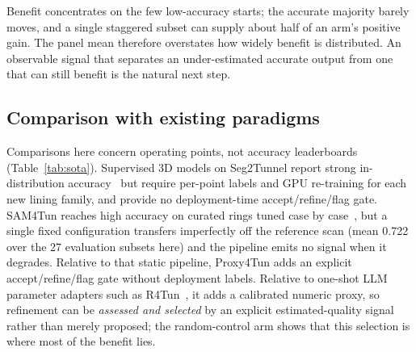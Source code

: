 \documentclass[a4paper,fleqn]{cas-dc}
\begin{document}
Benefit concentrates on the few low-accuracy starts; the accurate majority barely moves, and a single staggered subset can supply about half of an arm's positive gain. The panel mean therefore overstates how widely benefit is distributed. An observable signal that separates an under-estimated accurate output from one that can still benefit is the natural next step.

\subsection{Comparison with existing paradigms}\label{sec:positioning}

Comparisons here concern operating points, not accuracy leaderboards (Table~\ref{tab:sota}). Supervised 3D models on Seg2Tunnel report strong in-distribution accuracy~\cite{lin2024seg2tunnel} but require per-point labels and GPU re-training for each new lining family, and provide no deployment-time accept/refine/flag gate. SAM4Tun reaches high accuracy on curated rings tuned case by case~\cite{ye2025sam4tun}, but a single fixed configuration transfers imperfectly off the reference scan (mean 0.722 over the 27 evaluation subsets here) and the pipeline emits no signal when it degrades. Relative to that static pipeline, Proxy4Tun adds an explicit accept/refine/flag gate without deployment labels. Relative to one-shot LLM parameter adapters such as R4Tun~\cite{taoR4Tun}, it adds a calibrated numeric proxy, so refinement can be \emph{assessed and selected} by an explicit estimated-quality signal rather than merely proposed; the random-control arm shows that this selection is where most of the benefit lies.
\end{document}
